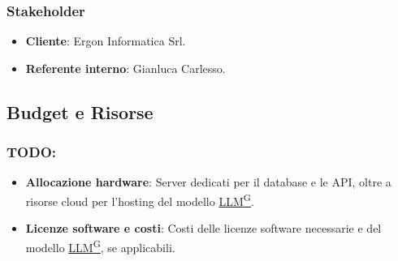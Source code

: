 \documentclass{article}
\begin{document}
        \subsubsection{Stakeholder}
        \begin{itemize}
            \item \textbf{Cliente}: Ergon Informatica Srl.
            \item \textbf{Referente interno}: Gianluca Carlesso.
        \end{itemize}

    \subsection{Budget e Risorse}
        \subsubsection{TODO: }
        \begin{itemize}
            \item \textbf{Allocazione hardware}: Server dedicati per il database e le API, oltre a risorse cloud per l'hosting del modello \href{https://code7crusaders.github.io/docs/PB/documentazione_interna/glossario.html#llm-large-language-model}{LLM\textsuperscript{G}}.
            \item \textbf{Licenze software e costi}: Costi delle licenze software necessarie e del modello \href{https://code7crusaders.github.io/docs/PB/documentazione_interna/glossario.html#llm-large-language-model}{LLM\textsuperscript{G}}, se applicabili.
        \end{itemize}
\end{document}
